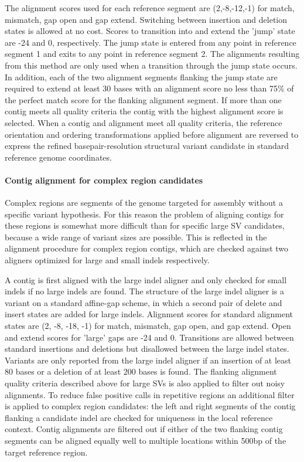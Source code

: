 \documentclass{article}
\begin{document}
The alignment scores used for each reference segment are (2,-8,-12,-1) for match, mismatch, gap open and gap extend. Switching between insertion and deletion states is allowed at no cost. Scores to transition into and extend the 'jump' state are -24 and 0, respectively. The jump state is entered from any point in reference segment 1 and exits to any point in reference segment 2. The alignments resulting from this method are only used when a transition through the jump state occurs. In addition, each of the two alignment segments flanking the jump state are required to extend at least 30 bases with an alignment score no less than 75\% of the perfect match score for the flanking alignment segment. If more than one contig meets all quality criteria the contig with the highest alignment score is selected. When a contig and alignment meet all quality criteria, the reference orientation and ordering transformations applied before alignment are reversed to express the refined basepair-resolution structural variant candidate in standard reference genome coordinates.


\paragraph{Contig alignment for complex region candidates}
Complex regions are segments of the genome targeted for assembly without a specific variant hypothesis. For this reason the problem of aligning contigs for these regions is somewhat more difficult than for specific large SV candidates, because a wide range of variant sizes are possible. This is reflected in the alignment procedure for complex region contigs, which are checked against two aligners optimized for large and small indels respectively.

A contig is first aligned with the large indel aligner and only checked for small indels if no large indels are found. The structure of the large indel aligner is a variant on a standard affine-gap scheme, in which a second pair of delete and insert states are added for large indels. Alignment scores for standard alignment states are (2, -8, -18, -1) for match, mismatch, gap open, and gap extend. Open and extend scores for 'large' gaps are -24 and 0. Transitions are allowed between standard insertions and deletions but disallowed between the large indel states. Variants are only reported from the large indel aligner if an insertion of at least 80 bases or a deletion of at least 200 bases is found. The flanking alignment quality criteria described above for large SVs is also applied to filter out noisy alignments. To reduce false positive calls in repetitive regions an additional filter is applied to complex region candidates: the left and right segments of the contig flanking a candidate indel are checked for uniqueness in the local reference context. Contig alignments are filtered out if either of the two flanking contig segments can be aligned equally well to multiple locations within 500bp of the target reference region.
\end{document}
